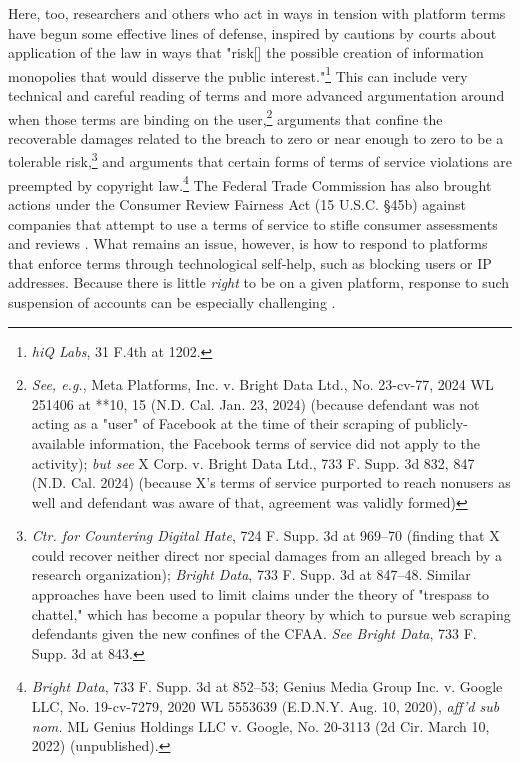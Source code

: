 Here, too, researchers and others who act in ways in tension with platform terms have begun some effective lines of defense, inspired by cautions by courts about application of the law in ways that "risk[] the possible creation of information monopolies that would disserve the public interest."\footnote{\textit{hiQ Labs}, 31 F.4th at 1202.} This can include very technical and careful reading of terms and more advanced argumentation around when those terms are binding on the user,\footnote{\textit{See, e.g.}, Meta Platforms, Inc. v. Bright Data Ltd., No. 23-cv-77, 2024 WL 251406 at **10, 15 (N.D. Cal. Jan. 23, 2024) (because defendant was not acting as a "user" of Facebook at the time of their scraping of publicly-available information, the Facebook terms of service did not apply to the activity); \textit{but see} X Corp. v. Bright Data Ltd., 733 F. Supp. 3d 832, 847 (N.D. Cal. 2024) (because X's terms of service purported to reach nonusers as well and defendant was aware of that, agreement was validly formed)} arguments that confine the recoverable damages related to the breach to zero or near enough to zero to be a tolerable risk,\footnote{\textit{Ctr. for Countering Digital Hate}, 724 F. Supp. 3d at 969–70 (finding that X could recover neither direct nor special damages from an alleged breach by a research organization); \textit{Bright Data}, 733 F. Supp. 3d at 847–48. Similar approaches have been used to limit claims under the theory of "trespass to chattel," which has become a popular theory by which to pursue web scraping defendants given the new confines of the CFAA. \textit{See Bright Data}, 733 F. Supp. 3d at 843.} and arguments that certain forms of terms of service violations are preempted by copyright law.\footnote{\textit{Bright Data}, 733 F. Supp. 3d at 852–53; Genius Media Group Inc. v. Google LLC, No. 19-cv-7279, 2020 WL 5553639 (E.D.N.Y. Aug. 10, 2020), \textit{aff'd sub nom.} ML Genius Holdings LLC v. Google, No. 20-3113 (2d Cir. March 10, 2022) (unpublished).} The Federal Trade Commission has also brought actions under the Consumer Review Fairness Act (15 U.S.C. §45b) against companies that attempt to use a terms of service to stifle consumer assessments and reviews \cite{ensor2024}. What remains an issue, however, is how to respond to platforms that enforce terms through technological self-help, such as blocking users or IP addresses. Because there is little \textit{right} to be on a given platform, response to such suspension of accounts can be especially challenging \cite{longpre_safe_2024}.
